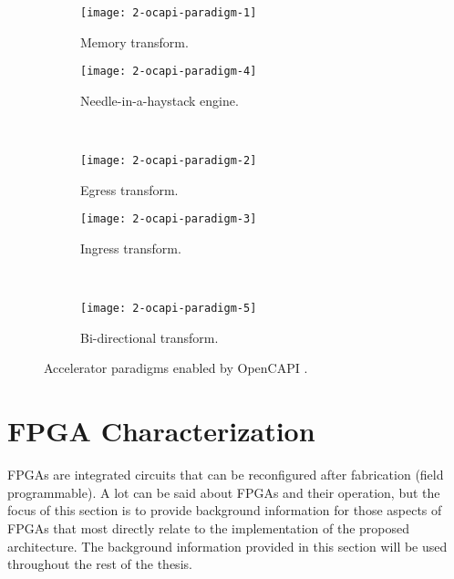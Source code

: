 \begin{figure}[H]
  \begin{subfigure}{.5\textwidth}
    \centering
    \texttt{[image: 2-ocapi-paradigm-1]}
    \caption{Memory transform.}
    \label{fig:2-ocapi-paradigm-1}
  \end{subfigure}%
  \begin{subfigure}{.5\textwidth}
    \centering
    \texttt{[image: 2-ocapi-paradigm-4]}
    \caption{Needle-in-a-haystack engine.}
    \label{fig:2-ocapi-paradigm-4}
  \end{subfigure}\\[1ex]
  \begin{subfigure}{.5\textwidth}
    \centering
    \texttt{[image: 2-ocapi-paradigm-2]}
    \caption{Egress transform.}
    \label{fig:2-ocapi-paradigm-2}
  \end{subfigure}%
  \begin{subfigure}{.5\textwidth}
    \centering
    \texttt{[image: 2-ocapi-paradigm-3]}
    \caption{Ingress transform.}
    \label{fig:2-ocapi-paradigm-3}
  \end{subfigure}\\[1ex]
  \begin{subfigure}{\textwidth}
    \centering
    \texttt{[image: 2-ocapi-paradigm-5]}
    \caption{Bi-directional transform.}
    \label{fig:2-ocapi-paradigm-5}
  \end{subfigure}
  \caption{Accelerator paradigms enabled by OpenCAPI \cite{opencapi-jeff-preso}.}
  \label{fig:2-ocapi-paradigm}
\end{figure}





\section{FPGA Characterization}
\label{sec:fpga-characterization}
FPGAs are integrated circuits that can be reconfigured after fabrication (field programmable). A lot can be said about FPGAs and their operation, but the focus of this section is to provide background information for those aspects of FPGAs that most directly relate to the implementation of the proposed architecture. The background information provided in this section will be used throughout the rest of the thesis.



